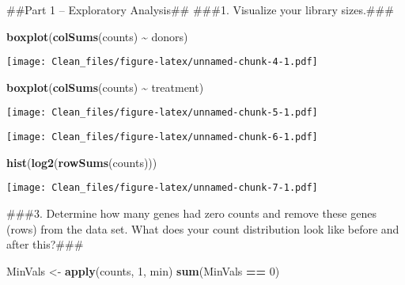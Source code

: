 \documentclass[
]{article}
\newenvironment{Shaded}{\begin{snugshade}}{\end{snugshade}}
\newcommand{\DecValTok}[1]{\textcolor[rgb]{0.00,0.00,0.81}{#1}}
\newcommand{\FunctionTok}[1]{\textcolor[rgb]{0.13,0.29,0.53}{\textbf{#1}}}
\newcommand{\NormalTok}[1]{#1}
\newcommand{\OtherTok}[1]{\textcolor[rgb]{0.56,0.35,0.01}{#1}}
\newcommand{\SpecialCharTok}[1]{\textcolor[rgb]{0.81,0.36,0.00}{\textbf{#1}}}
\begin{document}
\#\#Part 1 -- Exploratory Analysis\#\# \#\#\#1. Visualize your library
sizes.\#\#\#

\begin{Shaded}
\begin{Highlighting}[]
\FunctionTok{boxplot}\NormalTok{(}\FunctionTok{colSums}\NormalTok{(counts) }\SpecialCharTok{\textasciitilde{}}\NormalTok{ donors)}
\end{Highlighting}
\end{Shaded}

\texttt{[image: Clean\_files/figure-latex/unnamed-chunk-4-1.pdf]}

\begin{Shaded}
\begin{Highlighting}[]
\FunctionTok{boxplot}\NormalTok{(}\FunctionTok{colSums}\NormalTok{(counts) }\SpecialCharTok{\textasciitilde{}}\NormalTok{ treatment)}
\end{Highlighting}
\end{Shaded}

\texttt{[image: Clean\_files/figure-latex/unnamed-chunk-5-1.pdf]}

\begin{Shaded}
\end{Shaded}

\texttt{[image: Clean\_files/figure-latex/unnamed-chunk-6-1.pdf]}

\begin{Shaded}
\begin{Highlighting}[]
\FunctionTok{hist}\NormalTok{(}\FunctionTok{log2}\NormalTok{(}\FunctionTok{rowSums}\NormalTok{(counts)))}
\end{Highlighting}
\end{Shaded}

\texttt{[image: Clean\_files/figure-latex/unnamed-chunk-7-1.pdf]}

\#\#\#3. Determine how many genes had zero counts and remove these genes
(rows) from the data set. What does your count distribution look like
before and after this?\#\#\#

\begin{Shaded}
\begin{Highlighting}[]
\NormalTok{MinVals }\OtherTok{\textless{}{-}} \FunctionTok{apply}\NormalTok{(counts, }\DecValTok{1}\NormalTok{, min)}
\FunctionTok{sum}\NormalTok{(MinVals }\SpecialCharTok{==} \DecValTok{0}\NormalTok{) }
\end{Highlighting}
\end{Shaded}
\end{document}
